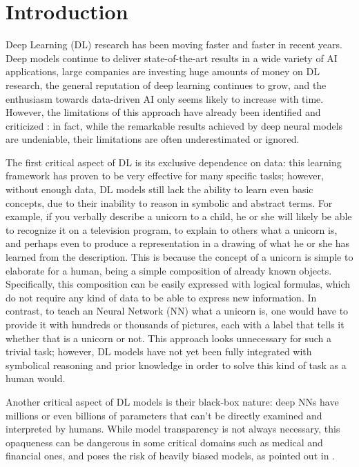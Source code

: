 \chapter{Introduction}
\label{introduction}

Deep Learning (DL) research has been moving faster and faster in recent years. Deep models continue to deliver state-of-the-art results in a wide variety of AI applications, large companies are investing huge amounts of money on DL research, the general reputation of deep learning continues to grow, and the enthusiasm towards data-driven AI only seems likely to increase with time. However, the limitations of this approach have already been identified and criticized \cite{marcus2018appraisal}: in fact, while the remarkable results achieved by deep neural models are undeniable, their limitations are often underestimated or ignored.

The first critical aspect of DL is its exclusive dependence on data: this learning framework has proven to be very effective for many specific tasks; however, without enough data, DL models still lack the ability to learn even basic concepts, due to their inability to reason in symbolic and abstract terms. For example, if you verbally describe a unicorn to a child, he or she will likely be able to recognize it on a television program, to explain to others what a unicorn is, and perhaps even to produce a representation in a drawing of what he or she has learned from the description. This is because the concept of a unicorn is simple to elaborate for a human, being a simple composition of already known objects. Specifically, this composition can be easily expressed with logical formulas, which do not require any kind of data to be able to express new information.
In contrast, to teach an Neural Network (NN) what a unicorn is, one would have to provide it with hundreds or thousands of pictures, each with a label that tells it whether that is a unicorn or not. This approach looks unnecessary for such a trivial task; however, DL models have not yet been fully integrated with symbolical reasoning and prior knowledge in order to solve this kind of task as a human would. 

Another critical aspect of DL models is their black-box nature: deep NNs have millions or even billions of parameters that can't be directly examined and interpreted by humans.
While model transparency is not always necessary, this opaqueness can be dangerous in some critical domains such as medical and financial ones, and poses the risk of heavily biased models, as pointed out in \cite{o2016weapons}.

